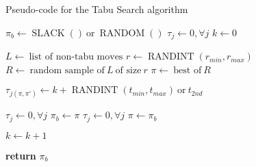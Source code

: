 

\begin{algorithm}
\caption{Pseudo-code for the Tabu Search algorithm}
\label{app:alg:tabu}
\begin{algorithmic}
	\State $\pi_b \gets \operatorname{SLACK}() ~\text{or}~ \operatorname{RANDOM}()$
	\State $\tau_j \gets 0, \forall j$
	\State $k \gets 0$

		\State $L \gets ~\text{list of non-tabu moves}$
		\State $r \gets \operatorname{RANDINT}(r_{min}, r_{max})$
		\State $R \gets ~\text{random sample of}~ L ~\text{of size}~ r$
		\State $\pi \gets ~\text{best of}~ R$


		\State $\tau_{j(\pi, \pi')} \gets k + \operatorname{RANDINT}(t_{min}, t_{max}) ~\text{or}~ t_{2nd} $ 

			\State $\tau_j \gets 0, \forall j$ 
			\State $\pi_b \gets \pi$
			\State $\tau_j \gets 0, \forall j$ 
			\State $\pi \gets \pi_b$
		\EndIf

		\State $k \gets k + 1$ 

	\EndWhile
	\State \textbf{return} $\pi_b$
\EndProcedure
\end{algorithmic}
\end{algorithm}